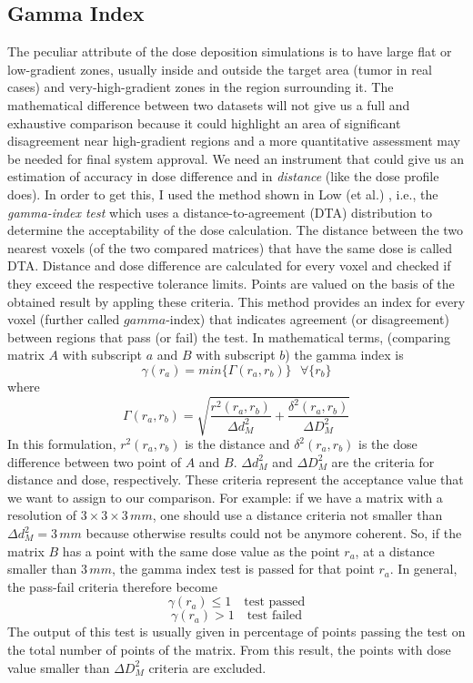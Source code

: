 \documentclass[12pt, a4paper, twoside]{book}
\begin{document}
\subsection{Gamma Index}
\label{sec:gam}
The peculiar attribute of the dose deposition simulations is to have large flat or low-gradient zones, usually inside and outside the target area (tumor in real cases) and very-high-gradient zones in the region surrounding it.
The mathematical difference between two datasets will not give us a full and exhaustive comparison because it could highlight an area of significant disagreement near high-gradient regions and a more quantitative assessment may be needed for final system approval.   
We need an instrument that could give us an estimation of accuracy in dose difference and in \emph{distance} (like the dose profile does).
In order to get this, I used the method shown in Low (et al.) \cite{low:gamma}, i.e., the \emph{gamma-index test} which uses a distance-to-agreement (DTA) distribution to determine the acceptability of the dose calculation. 
The distance between the two nearest voxels (of the two compared matrices) that have the same dose is called DTA. Distance and dose difference are calculated for every voxel and checked if they exceed the respective tolerance limits. Points are valued on the basis of the obtained result by appling these criteria. This method provides an index for every voxel (further called $gamma$-index) that indicates agreement (or disagreement) between regions that pass (or fail) the test.
In mathematical terms, (comparing matrix $A$ with subscript $a$ and $B$ with subscript $b$) the gamma index is
\[
\gamma(r_a) = min\{\Gamma(r_a,r_b) \}\,\,\,\,\forall\{ r_b\}
\]
where
\[
\Gamma(r_a,r_b) = \sqrt{\frac{r^2(r_a,r_b)}{\Delta d^2_M} + \frac{\delta^2(r_a,r_b)}{\Delta D^2_M}}
\]
In this formulation, $r^2(r_a,r_b)$ is the distance and $\delta^2(r_a,r_b)$ is the dose difference between two point of $A$ and $B$. $\Delta d^2_M$ and $\Delta D^2_M$ are the criteria for distance and dose, respectively.
These criteria represent the acceptance value that we want to assign to our comparison. For example: if we have a matrix with a resolution of $3\times3\times3\,mm$, one should use a distance criteria not smaller than $\Delta d^2_M = 3\,mm$ because otherwise results could not be anymore coherent. So, if the matrix $B$ has a point with the same dose value as the point $r_a$, at a distance smaller than $3\,mm$, the gamma index test is passed for that point $r_a$.
In general, the pass-fail criteria therefore become
\[
\gamma(r_a)\leq1\,\,\,\,\,\,\textrm{test passed}
\]
\[
\gamma(r_a)>1\,\,\,\,\,\,\textrm{test failed}
\]
The output of this test is usually given in percentage of points passing the test on the total number of points of the matrix.
From this result, the points with dose value smaller than $\Delta D^2_M$ criteria are excluded.
\end{document}
